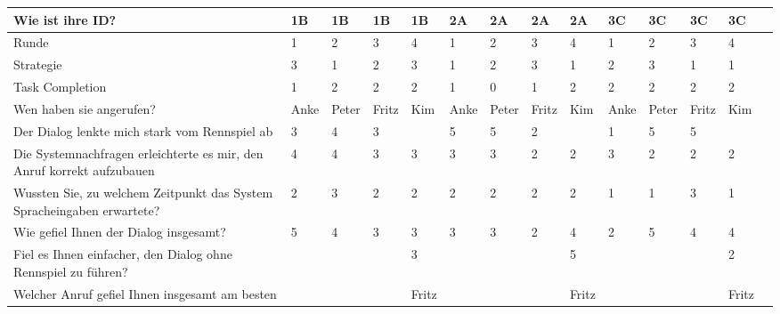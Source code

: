 \documentclass[12pt,a4paper]{scrartcl}
\begin{document}
\begin{appendix}
\begin{table}
\begin{tabular}{|p{6cm}| p{0.8cm} | p{0.8cm} | p{0.8cm} | p{0.8cm} || p{0.8cm} | p{0.8cm} | p{0.8cm} | p{0.8cm} || p{0.8cm} | p{0.8cm} | p{0.8cm} | p{0.8cm} | p{} | }
	Wie ist ihre ID? & 1B & 1B & 1B & 1B & 2A & 2A & 2A & 2A & 3C & 3C & 3C & 3C \\ \hline \hline
	Runde & 1 & 2 & 3 & 4 & 1 & 2 & 3 & 4 & 1 & 2 & 3 & 4 \\ \hline
	Strategie & 3 & 1 & 2 & 3 & 1 & 2 & 3 & 1 & 2 & 3 & 1 & 1 \\ \hline \hline
	Task Completion & 1 & 2 & 2 & 2 & 1 & 0 & 1 & 2 & 2 & 2 & 2 & 2 \\ \hline \hline
	Wen haben sie angerufen? & Anke & Peter & Fritz & Kim & Anke & Peter & Fritz & Kim & Anke & Peter & Fritz & Kim \\ \hline
	Der Dialog lenkte mich stark vom Rennspiel ab & 3 & 4 & 3 &  & 5 & 5 & 2 &  & 1 & 5 & 5 &  \\ \hline
	Die Systemnachfragen erleichterte es mir, den Anruf korrekt aufzubauen & 4 & 4 & 3 & 3 & 3 & 3 & 2 & 2 & 3 & 2 & 2 & 2 \\ \hline
	Wussten Sie, zu welchem Zeitpunkt das System Spracheingaben erwartete? & 2 & 3 & 2 & 2 & 2 & 2 & 2 & 2 & 1 & 1 & 3 & 1 \\ \hline
	Wie gefiel Ihnen der Dialog insgesamt? & 5 & 4 & 3 & 3 & 3 & 3 & 2 & 4 & 2 & 5 & 4 & 4 \\ \hline
	Fiel es Ihnen einfacher, den Dialog ohne Rennspiel zu führen? &  &  &  & 3 &  &  &  & 5 &  &  &  & 2 \\ \hline
	Welcher Anruf gefiel Ihnen insgesamt am besten &  &  &  & Fritz &  &  &  & Fritz &  &  &  & Fritz \\ \hline
\end{tabular}
\end{table}


\end{appendix}
\end{document}
